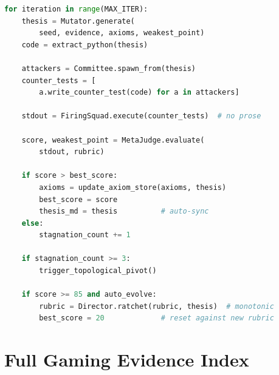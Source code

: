 \documentclass[10pt,twocolumn]{article}
\begin{document}
\begin{lstlisting}[language=Python]
for iteration in range(MAX_ITER):
    thesis = Mutator.generate(
        seed, evidence, axioms, weakest_point)
    code = extract_python(thesis)

    attackers = Committee.spawn_from(thesis)
    counter_tests = [
        a.write_counter_test(code) for a in attackers]

    stdout = FiringSquad.execute(counter_tests)  # no prose

    score, weakest_point = MetaJudge.evaluate(
        stdout, rubric)

    if score > best_score:
        axioms = update_axiom_store(axioms, thesis)
        best_score = score
        thesis_md = thesis          # auto-sync
    else:
        stagnation_count += 1

    if stagnation_count >= 3:
        trigger_topological_pivot()

    if score >= 85 and auto_evolve:
        rubric = Director.ratchet(rubric, thesis)  # monotonic
        best_score = 20             # reset against new rubric
\end{lstlisting}

\section{Full Gaming Evidence Index}

\begin{table}[H]
\centering
\caption{Verbatim evidence index with source log files}
\end{table}
\end{document}
